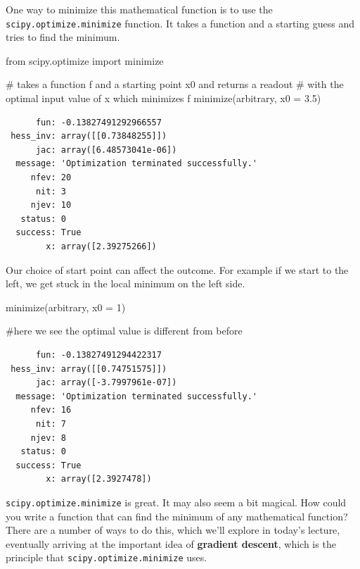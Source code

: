 \documentclass[
  letterpaper,
  DIV=11,
  numbers=noendperiod]{scrreprt}
\newenvironment{Shaded}{\begin{snugshade}}{\end{snugshade}}
\newcommand{\CommentTok}[1]{\textcolor[rgb]{0.37,0.37,0.37}{#1}}
\newcommand{\DecValTok}[1]{\textcolor[rgb]{0.68,0.00,0.00}{#1}}
\newcommand{\FloatTok}[1]{\textcolor[rgb]{0.68,0.00,0.00}{#1}}
\newcommand{\ImportTok}[1]{\textcolor[rgb]{0.00,0.46,0.62}{#1}}
\newcommand{\NormalTok}[1]{\textcolor[rgb]{0.00,0.23,0.31}{#1}}
\newcommand{\OperatorTok}[1]{\textcolor[rgb]{0.37,0.37,0.37}{#1}}
\begin{document}
One way to minimize this mathematical function is to use the
\texttt{scipy.optimize.minimize} function. It takes a function and a
starting guess and tries to find the minimum.

\begin{Shaded}
\begin{Highlighting}[]
\ImportTok{from}\NormalTok{ scipy.optimize }\ImportTok{import}\NormalTok{ minimize}

\CommentTok{\# takes a function f and a starting point x0 and returns a readout }
\CommentTok{\# with the optimal input value of x which minimizes f}
\NormalTok{minimize(arbitrary, x0 }\OperatorTok{=} \FloatTok{3.5}\NormalTok{)}
\end{Highlighting}
\end{Shaded}

\begin{verbatim}
      fun: -0.13827491292966557
 hess_inv: array([[0.73848255]])
      jac: array([6.48573041e-06])
  message: 'Optimization terminated successfully.'
     nfev: 20
      nit: 3
     njev: 10
   status: 0
  success: True
        x: array([2.39275266])
\end{verbatim}

Our choice of start point can affect the outcome. For example if we
start to the left, we get stuck in the local minimum on the left side.

\begin{Shaded}
\begin{Highlighting}[]
\NormalTok{minimize(arbitrary, x0 }\OperatorTok{=} \DecValTok{1}\NormalTok{)}

\CommentTok{\#here we see the optimal value is different from before}
\end{Highlighting}
\end{Shaded}

\begin{verbatim}
      fun: -0.13827491294422317
 hess_inv: array([[0.74751575]])
      jac: array([-3.7997961e-07])
  message: 'Optimization terminated successfully.'
     nfev: 16
      nit: 7
     njev: 8
   status: 0
  success: True
        x: array([2.3927478])
\end{verbatim}

\texttt{scipy.optimize.minimize} is great. It may also seem a bit
magical. How could you write a function that can find the minimum of any
mathematical function? There are a number of ways to do this, which
we'll explore in today's lecture, eventually arriving at the important
idea of \textbf{gradient descent}, which is the principle that
\texttt{scipy.optimize.minimize} uses.
\end{document}
